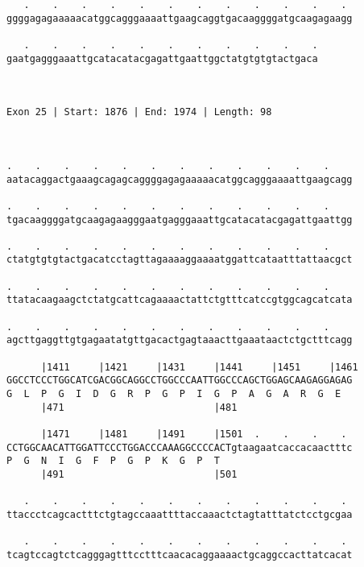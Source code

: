 \documentclass{article}
\begin{document}
\begin{Verbatim}
   .    .    .    .    .    .    .    .    .    .    .    . 
ggggagagaaaaacatggcagggaaaattgaagcaggtgacaaggggatgcaagagaagg
                                                            
   .    .    .    .    .    .    .    .    .    .    .
gaatgagggaaattgcatacatacgagattgaattggctatgtgtgtactgaca
                                                      
                                                      
 
Exon 25 | Start: 1876 | End: 1974 | Length: 98



.    .    .    .    .    .    .    .    .    .    .    .    
aatacaggactgaaagcagagcaggggagagaaaaacatggcagggaaaattgaagcagg
                                                            
.    .    .    .    .    .    .    .    .    .    .    .    
tgacaaggggatgcaagagaagggaatgagggaaattgcatacatacgagattgaattgg
                                                            
.    .    .    .    .    .    .    .    .    .    .    .    
ctatgtgtgtactgacatcctagttagaaaaggaaaatggattcataatttattaacgct
                                                            
.    .    .    .    .    .    .    .    .    .    .    .    
ttatacaagaagctctatgcattcagaaaactattctgtttcatccgtggcagcatcata
                                                            
.    .    .    .    .    .    .    .    .    .    .    .    
agcttgaggttgtgagaatatgttgacactgagtaaacttgaaataactctgctttcagg
                                                            
      |1411     |1421     |1431     |1441     |1451     |1461
GGCCTCCCTGGCATCGACGGCAGGCCTGGCCCAATTGGCCCAGCTGGAGCAAGAGGAGAG
G  L  P  G  I  D  G  R  P  G  P  I  G  P  A  G  A  R  G  E  
      |471                          |481                    
  
      |1471     |1481     |1491     |1501  .    .    .    . 
CCTGGCAACATTGGATTCCCTGGACCCAAAGGCCCCACTgtaagaatcaccacaactttc
P  G  N  I  G  F  P  G  P  K  G  P  T                       
      |491                          |501                    
  
   .    .    .    .    .    .    .    .    .    .    .    . 
ttaccctcagcactttctgtagccaaattttaccaaactctagtatttatctcctgcgaa
                                                            
   .    .    .    .    .    .    .    .    .    .    .    . 
tcagtccagtctcagggagtttcctttcaacacaggaaaactgcaggccacttatcacat
                                                            

\end{Verbatim}
\end{document}
